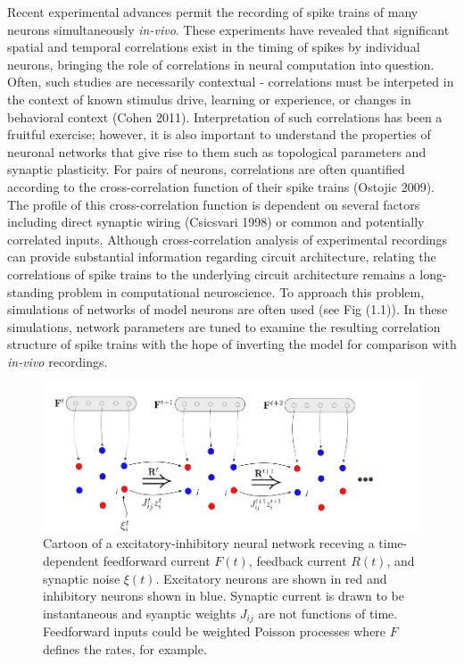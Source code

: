 \documentclass{ucetd}
\begin{document}
Recent experimental advances permit the recording of spike trains of many neurons simultaneously \emph{in-vivo}. These experiments have revealed that significant spatial and temporal correlations exist in the timing of spikes by individual neurons, bringing the role of correlations in neural computation into question. Often, such studies are necessarily contextual - correlations must be interpeted in the context of known stimulus drive, learning or experience, or changes in behavioral context (Cohen 2011). Interpretation of such correlations has been a fruitful exercise; however, it is also important to understand the properties of neuronal networks that give rise to them such as topological parameters and synaptic plasticity. For pairs of neurons, correlations are often quantified according to the cross-correlation function of their spike trains (Ostojic 2009). The profile of this cross-correlation function is dependent on several factors including direct synaptic wiring (Csicsvari 1998) or common and potentially correlated inputs. Although cross-correlation analysis of experimental recordings can provide substantial information regarding circuit architecture, relating the correlations of spike trains to the underlying circuit architecture remains a long-standing problem in computational neuroscience. To approach this problem, simulations of networks of model neurons are often used (see Fig (1.1)). In these simulations, network parameters are tuned to examine the resulting correlation structure of spike trains with the hope of inverting the model for comparison with \emph{in-vivo} recordings. 

\begin{figure}[t!]
\centering
\includegraphics[width=175mm]{figure-1}
\caption{Cartoon of a excitatory-inhibitory neural network receving a time-dependent feedforward current $F(t)$, feedback current $R(t)$, and synaptic noise $\xi(t)$. Excitatory neurons are shown in red and inhibitory neurons shown in blue. Synaptic current is drawn to be instantaneous and syanptic weights $J_{ij}$ are not functions of time. Feedforward inputs could be weighted Poisson processes where $F$ defines the rates, for example.}
\end{figure}
\end{document}
